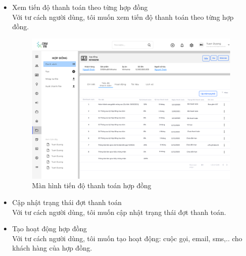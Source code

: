 \documentclass[12pt,a4paper]{article}
\begin{document}
\begin{enumerate}
\begin{itemize}
            \item Xem tiến độ thanh toán theo từng hợp đồng \\
            Với tư cách người dùng, tôi muốn xem tiến độ thanh toán theo từng hợp đồng.

            \begin{figure}[H]
                \centering \includegraphics[width=\textwidth]{Img/Nguyet/Hopdong/tiendott.png}
                \vspace{0.5cm}
                \caption{Màn hình tiến độ thanh toán hợp đồng }
                \label{tdtthd}
            \end{figure}


            \item Cập nhật trạng thái đợt thanh toán \\
            Với tư cách người dùng, tôi muốn cập nhật trạng thái đợt thanh toán.

            \item Tạo hoạt động hợp đồng \\
            Với tư cách người dùng, tôi muốn tạo hoạt động: cuộc gọi, email, sms,.. cho khách hàng của hợp đồng.


\end{itemize}
\end{enumerate}
\end{document}

